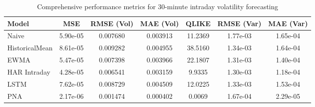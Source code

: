\documentclass[journal]{IEEEtran}
\begin{document}
\begin{table*}[!t]
\centering
\caption{Comprehensive performance metrics for 30-minute intraday volatility forecasting}
\label{tab:comprehensive_results}
\begin{tabular}{@{}lS[table-format=1.2e-1]S[table-format=1.6]S[table-format=1.6]S[table-format=1.4]S[table-format=1.2e-1]S[table-format=1.2e-1]@{}}
\toprule
{Model} & {MSE} & {RMSE (Vol)} & {MAE (Vol)} & {QLIKE} & {RMSE (Var)} & {MAE (Var)} \\
\midrule
{}Naive & 5.90e-05 & 0.007680 & 0.003913 & 11.2369 & 1.77e-03 & 1.65e-04 \\
HistoricalMean & 8.61e-05 & 0.009282 & 0.004955 & 38.5160 & 1.34e-03 & 1.64e-04 \\
EWMA & 5.47e-05 & 0.007398 & 0.003966 & 22.1807 & 1.31e-03 & 1.40e-04 \\
HAR Intraday & 4.28e-05 & 0.006541 & 0.003159 & 9.9335 & 1.30e-03 & 1.18e-04 \\
LSTM & 7.62e-05 & 0.008729 & 0.004509 & 12.0225 & 1.33e-03 & 1.53e-04 \\
PNA & 2.17e-06 & 0.001474 & 0.000402 & 0.0069 & 1.67e-04 & 2.29e-05 \\
\bottomrule
\end{tabular}
\end{table*}
\end{document}
